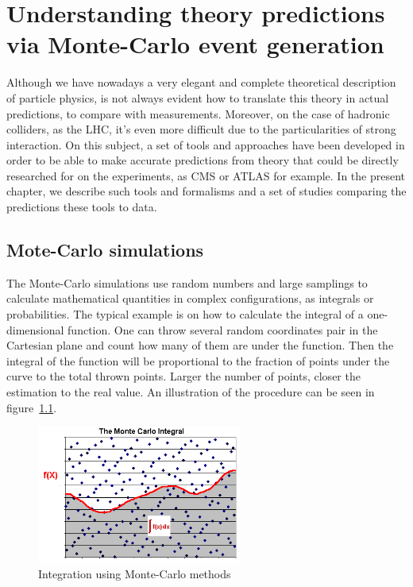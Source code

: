 \chapter[MC event generation]{Understanding theory predictions via Monte-Carlo event generation}
\label{chap:MC}

Although we have nowadays a very elegant and complete theoretical description of particle physics, is not always evident how to translate this theory in actual predictions, to compare with measurements. Moreover, on the case of hadronic colliders, as the LHC, it's even more difficult due to the particularities of strong interaction. On this subject, a set of tools and approaches have been developed in order to be able to make accurate predictions from theory that could be directly researched for on the experiments, as CMS or ATLAS for example. In the present chapter, we describe such tools and formalisms and a set of studies comparing the predictions these tools to data. 

\section{Mote-Carlo simulations}
\label{sec:MC}

The Monte-Carlo simulations use random numbers and large samplings to calculate mathematical quantities in complex configurations, as integrals or probabilities. The typical example is on how to calculate the integral of a one-dimensional function. One can throw several random coordinates pair in the Cartesian plane and count how many of them are under the function. Then the integral of the function will be proportional to the fraction of points under the curve to the total thrown points. Larger the number of points, closer the estimation to the real value. An illustration of the procedure can be seen in figure~\ref{fig:mc_int}.

\begin{figure}[!Hhtbp]
  \begin{center}
    \includegraphics[width=0.6\textwidth]{figs/mc_integral.png}
    \caption{Integration using Monte-Carlo methods}
    \label{fig:mc_int}
  \end{center}
\end{figure}

